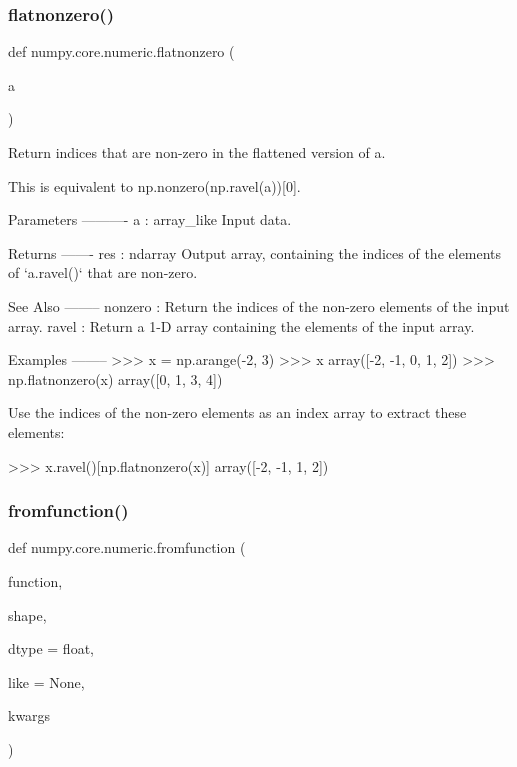 \mbox{\label{namespacenumpy_1_1core_1_1numeric_ac8b23f45060462d59df4609deb36da30}} 
\subsubsection{\texorpdfstring{flatnonzero()}{flatnonzero()}}
{\footnotesize\ttfamily def numpy.\+core.\+numeric.\+flatnonzero (\begin{DoxyParamCaption}\item[{}]{a }\end{DoxyParamCaption})}

\begin{DoxyVerb}Return indices that are non-zero in the flattened version of a.

This is equivalent to np.nonzero(np.ravel(a))[0].

Parameters
----------
a : array_like
    Input data.

Returns
-------
res : ndarray
    Output array, containing the indices of the elements of `a.ravel()`
    that are non-zero.

See Also
--------
nonzero : Return the indices of the non-zero elements of the input array.
ravel : Return a 1-D array containing the elements of the input array.

Examples
--------
>>> x = np.arange(-2, 3)
>>> x
array([-2, -1,  0,  1,  2])
>>> np.flatnonzero(x)
array([0, 1, 3, 4])

Use the indices of the non-zero elements as an index array to extract
these elements:

>>> x.ravel()[np.flatnonzero(x)]
array([-2, -1,  1,  2])\end{DoxyVerb}
 \mbox{\label{namespacenumpy_1_1core_1_1numeric_aabe97d2dd9a9996cb96ca02a03ef0ae6}} 
\subsubsection{\texorpdfstring{fromfunction()}{fromfunction()}}
{\footnotesize\ttfamily def numpy.\+core.\+numeric.\+fromfunction (\begin{DoxyParamCaption}\item[{}]{function,  }\item[{}]{shape,  }\item[{}]{dtype = {\ttfamily float},  }\item[{}]{like = {\ttfamily None},  }\item[{}]{kwargs }\end{DoxyParamCaption})}

